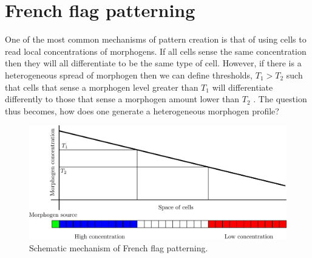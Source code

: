 \section{French flag patterning}
One of the most common mechanisms of pattern creation is that of using cells to read local concentrations of morphogens. If all cells sense the same concentration then they will all differentiate to be the same type of cell. However, if there is a heterogeneous spread of morphogen then we can define thresholds, $T_1>T_2$ such that cells that sense a morphogen level greater than $T_1$ will differentiate differently to those that sense a morphogen amount lower than $T_2$ . The question thus becomes, how does one generate a heterogeneous morphogen profile?
\begin{figure}[!!!h!!!tb]
\centering
\includegraphics[width=\textwidth]{../Pictures/French_flag_patterning.png}
\caption{Schematic mechanism of French flag patterning. \label{French flag schematic}}
\end{figure}

